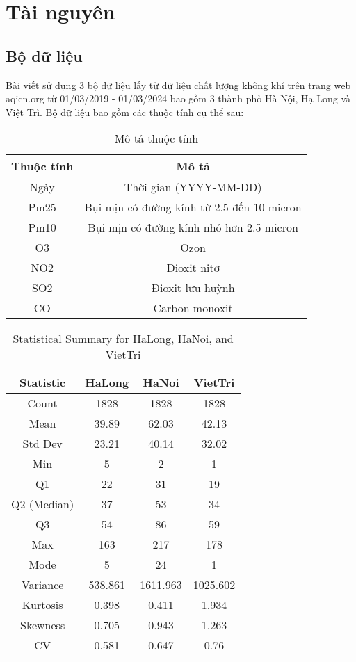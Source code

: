 \section{Tài nguyên}
\subsection{Bộ dữ liệu}
Bài viết sử dụng 3 bộ dữ liệu lấy từ dữ liệu chất lượng không khí trên trang web aqicn.org từ 01/03/2019 - 01/03/2024 bao gồm 3 thành phố Hà Nội, Hạ Long và Việt Trì.
Bộ dữ liệu bao gồm các thuộc tính cụ thể sau:
\begin{table}[h]
  \centering
  \caption{Mô tả thuộc tính}
  \begin{tabular}{|c|c|}
    \hline
    \textbf{Thuộc tính} & \textbf{Mô tả} \\ \hline
    Ngày & Thời gian (YYYY-MM-DD) \\ \hline
    Pm25 & Bụi mịn có đường kính từ 2.5 đến 10 micron \\ \hline
    Pm10 & Bụi mịn có đường kính nhỏ hơn 2.5 micron \\ \hline
    O3 & Ozon \\ \hline
    NO2 & Đioxit nitơ \\ \hline
    SO2 & Đioxit lưu huỳnh \\ \hline
    CO & Carbon monoxit \\ \hline
  \end{tabular}
\end{table}
\vspace{3cm}

\begin{table}[h!]
\centering
\begin{tabular}{|c|c|c|c|}
\hline
Statistic & HaLong & HaNoi & VietTri \\
\hline
Count & 1828 & 1828 & 1828 \\
Mean & 39.89 & 62.03 & 42.13 \\
Std Dev & 23.21 & 40.14 & 32.02 \\
Min & 5 & 2 & 1 \\
Q1 & 22 & 31 & 19 \\
Q2 (Median) & 37 & 53 & 34 \\
Q3 & 54 & 86 & 59 \\
Max & 163 & 217 & 178 \\
Mode & 5 & 24 & 1 \\
Variance & 538.861 & 1611.963 & 1025.602 \\
Kurtosis & 0.398 & 0.411 & 1.934 \\
Skewness & 0.705 & 0.943 & 1.263 \\
CV & 0.581 & 0.647 & 0.76 \\
\hline
\end{tabular}
\caption{Statistical Summary for HaLong, HaNoi, and VietTri}
\label{tab:stats}
\end{table}

